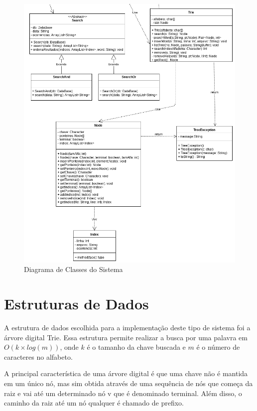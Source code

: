 \documentclass[12pt]{article}
\begin{document}
\begin{figure}[!htb]
\centering
\includegraphics[width=.96\textwidth]{img/sbi_project-part2.png}
\caption{Diagrama de Classes do Sistema}
\label{fig:diagramaDeClasses}
\end{figure}
  
 \newpage
 
\section{Estruturas de Dados}

A estrutura de dados escolhida para a implementação deste tipo de sistema foi a árvore digital Trie. Essa estrutura permite realizar a busca por uma palavra em $O(k\times log(m))$, onde $k$ é o tamanho da chave buscada e $m$ é o número de caracteres no alfabeto.

A principal característica de uma árvore digital é que uma chave não é mantida em um único nó, mas sim obtida através de uma sequência de nós que começa da raiz e vai até um determinado nó v que é denominado terminal. Além disso, o caminho da raiz até um nó qualquer é chamado de prefixo. 
\end{document}
